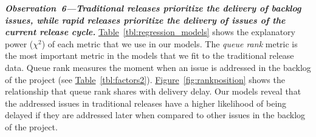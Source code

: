 \begin{sloppypar}
\noindent\textit{\textbf{Observation~6---Traditional releases prioritize the
delivery of backlog issues, while rapid releases prioritize the delivery
of issues of the current release cycle.}}
\hyperref[tbl:regression_models]{Table}~\ref{tbl:regression_models} shows the explanatory power ($\chi^2$) of each
metric that we use in our models.  The \textit{queue rank} metric is the most
important metric in the models that we fit to the traditional release data.
Queue rank measures the moment when an issue is addressed in the backlog of the
project (see \hyperref[tbl:factors2]{Table}~\ref{tbl:factors2}).
\hyperref[fig:rankposition]{Figure}~\ref{fig:rankposition} shows the relationship that queue rank shares with
delivery delay. Our models reveal that the addressed issues in traditional
releases have a higher likelihood of being delayed if they are addressed later
when compared to other issues in the backlog of the project.   

\begin{figure}[t]
	\centering


\end{figure}
\end{sloppypar}
